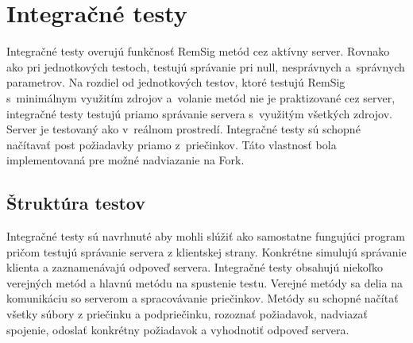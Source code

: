 \documentclass[
  digital, %
  table,   %
oneside,
  nolof,     %
  nolot,     %
]{fithesis3}
\begin{document}
\section{Integračné testy}
Integračné testy  overujú funkčnosť RemSig metód cez aktívny server. Rovnako ako pri jednotkových testoch, testujú správanie pri null, nesprávnych a~správnych parametrov. Na rozdiel od jednotkových testov, ktoré testujú RemSig s~minimálnym využitím zdrojov a~volanie metód nie je praktizované cez server, integračné testy testujú priamo správanie servera s~využitým všetkých zdrojov. Server je testovaný ako v~reálnom prostredí. Integračné testy sú schopné načítavať post požiadavky priamo z~priečinkov. Táto  vlastnosť bola implementovaná pre možné nadviazanie na  Fork.
\subsection{Štruktúra testov}  
 Integračné testy sú navrhnuté aby mohli slúžiť ako samostatne fungujúci program pričom testujú správanie servera z klientskej strany. Konkrétne simulujú správanie klienta a zaznamenávajú odpoveď servera. Integračné testy obsahujú niekoľko verejných metód a hlavnú metódu na spustenie testu. Verejné metódy sa delia na komunikáciu so serverom a spracovávanie priečinkov. Metódy su schopné načítať všetky súbory z priečinku a podpriečinku, rozoznať požiadavok, nadviazať spojenie, odoslať konkrétny požiadavok a vyhodnotiť odpoveď servera. 
\end{document}
